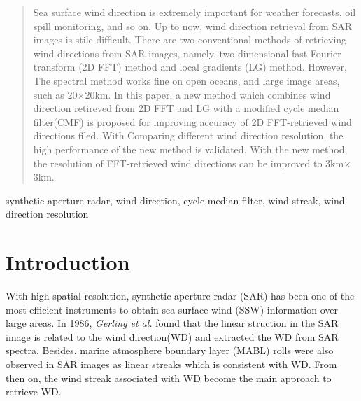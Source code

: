 \documentclass{article}
\begin{document}
%
\maketitle
%
\begin{abstract}
Sea surface wind direction is extremely important for weather forecasts, oil spill monitoring, and so on. Up to now, wind direction retrieval from SAR images is stile difficult. There are two conventional methods of retrieving wind directions from SAR images, namely, two-dimensional fast Fourier transform (2D FFT) method and local gradients (LG) method. However, The spectral method works fine on open oceans, and large image areas, such as 20$\times$20km. In this paper, a new method which combines wind direction retireved from 2D FFT and LG with a modified cycle median filter(CMF) is proposed for improving accuracy of 2D FFT-retrieved wind directions filed. With Comparing different wind direction resolution, the high performance of the new method is validated. With the new method, the resolution of FFT-retrieved wind directions can be improved to 3km$\times$3km.
\end{abstract}
\begin{keywords}
synthetic aperture radar, wind direction, cycle median filter, wind streak, wind direction resolution
\end{keywords}
%
\section{Introduction}
\label{sec:intro}

With high spatial resolution, synthetic aperture radar (SAR) has been one of the most efficient instruments to obtain sea surface wind (SSW) information over large areas. In 1986, {\it Gerling et al.}\cite{Gerling:1986ee} found that the linear struction in the SAR image is related to the wind direction(WD) and extracted the WD from SAR spectra. Besides, marine atmosphere boundary layer (MABL) rolls were also observed in SAR images as linear streaks which is consistent with WD\cite{Alpers:1994hy}. From then on, the wind streak associated with WD become the main approach to retrieve WD. 
\end{document}
